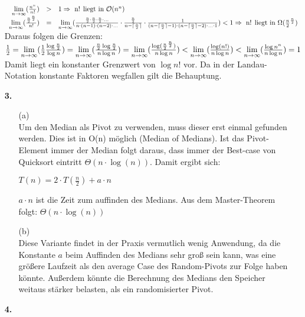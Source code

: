 \documentclass[a4paper,11pt,fleqn]{scrartcl}
\begin{document}
\begin{enumerate}
			\(
			\begin{array}{rcl}
				\lim\limits_{n\to\infty}(\frac{n^n}{n!})&>& 1 \Rightarrow \text{ n! liegt in $\mathcal{O}(n^n)$} \\
				\lim\limits_{n\to\infty}(\frac{\frac{n}{2}^\frac{n}{2}}{n!}) &=& \lim\limits_{n\to\infty} ( \frac{\frac{n}{2}\cdot\frac{n}
				{2}\cdot\frac{n}{2}\cdot ...}{n\cdot (n-1 )\cdot (n-2 )\cdot ...}
				\cdot \frac{\frac{n}{2}}{n- \lceil\frac{n}{2}\rceil}
				\cdot \frac{1}{(n - \lceil\frac{n}{2}\rceil -1) \cdot (n - \lceil\frac{n}{2}\rceil -2 )\cdot ...
				\cdot 1}) < 1 \Rightarrow \text{ n! liegt in $\Omega(\frac{n}{2}^\frac{n}{2})$} \\
			\end{array}
			\) \\
			Daraus folgen die Grenzen: \\
			\(
				\frac{1}{2}=\lim\limits_{n\to\infty}(\frac{1}{2}\frac{\log\frac{n}{2}}{\log n}) =\lim\limits_{n\to\infty}(\frac{\frac{n}{2}\log\frac{n}
				{2}}{n\log n}) = \lim\limits_{n\to\infty}(\frac{\log(\frac{n}{2}^\frac{n}{2})}{n\log n})<\lim\limits_{n\to\infty}(\frac{\log(n!)}{n\log 
				n})<\lim\limits_{n\to\infty}(\frac{\log n^n}{n \log n}) = 1 \\
			\)
			Damit liegt ein konstanter Grenzwert von $\log n!$ vor. Da in der Landau-Notation konstante Faktoren 
			wegfallen gilt die Behauptung.
			\newpage
		\item[\textbf{3.}]
		\begin{enumerate}
			\item[(a)]\quad \\
				Um den Median als Pivot zu verwenden, muss dieser erst einmal gefunden werden. Dies ist in O(n) 
				möglich (Median of Medians). Ist das Pivot-Element immer der Median folgt daraus, dass immer der
				Best-case von Quicksort eintritt \(\Theta(n \cdot \log(n))\). Damit ergibt sich:
				\begin{center}
					\(T(n) = 2 \cdot T(\frac{n}{2}) + a \cdot n\)
				\end{center}
				\(a \cdot n\) ist die Zeit zum auffinden des Medians. Aus dem Master-Theorem folgt: 
				\(\Theta(n \cdot \log(n))\)
			\item[(b)]\quad \\
				Diese Variante findet in der Praxis vermutlich wenig Anwendung, da die Konstante $a$ beim 
				Auffinden des Medians sehr groß sein kann, was eine größere Laufzeit als den average Case des
				Random-Pivots zur Folge haben könnte. Außerdem könnte die Berechnung des Medians den Speicher
				weitaus stärker belasten, als ein randomisierter Pivot.
		\end{enumerate}
		\item[\textbf{4.}]

\end{enumerate}
\end{document}
